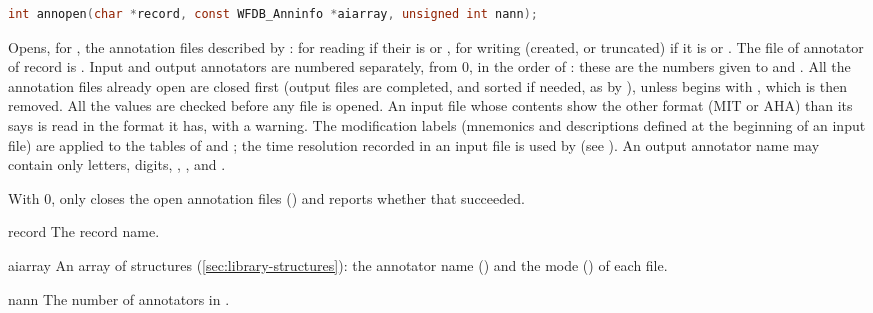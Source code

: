\begin{lstlisting}[language=C,style=signature]
int annopen(char *record, const WFDB_Anninfo *aiarray, unsigned int nann);
\end{lstlisting}
Opens, for , the  annotation files described by
: for reading if their  is  or
, for writing (created, or truncated) if it is
 or . The file of annotator
 of record  is . Input and output
annotators are numbered separately, from 0, in the order of :
these are the numbers given to  and . All the
annotation files already open are closed first (output files are completed,
and sorted if needed, as by ), unless  begins with
\code{+}, which is then removed. All the  values are checked before
any file is opened. An input file whose contents show the other format (MIT or
AHA) than its  says is read in the format it has, with a warning.
The modification labels (mnemonics and descriptions defined at the beginning
of an input file) are applied to the tables of  and
; the time resolution recorded in an input file is used by
 (see ). An output annotator name may contain
only letters, digits, \code{\_}, \code{\textasciitilde}, \code{-} and
\code{/}.

With  0,  only closes the open annotation files
() and reports whether that succeeded.
\begin{params}
\item[record] The record name.
\item[aiarray] An array of   structures
  (\cref{sec:library-structures}): the annotator name () and the
  mode () of each file.
\item[nann] The number of annotators in .
\end{params}

